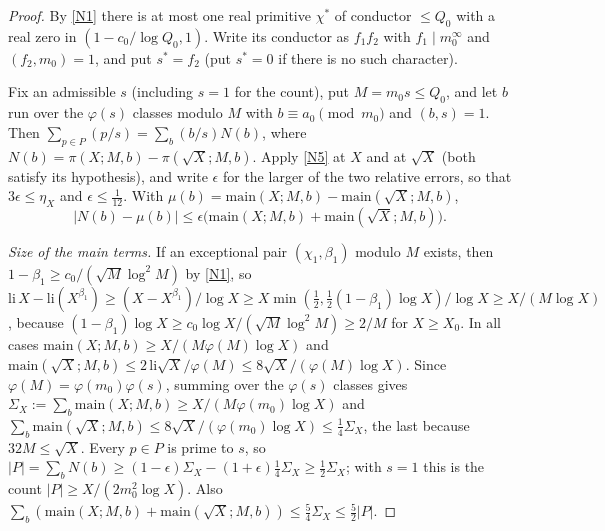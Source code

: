 \documentclass[11pt]{amsart}
\theoremstyle{plain}
\theoremstyle{definition}
\numberwithin{equation}{section}
\begin{document}
\begin{proof}
By \ref{N1} there is at most one real primitive $\chi^\ast$ of conductor $\le Q_0$ with a real zero
in $(1-c_0/\log Q_0,1)$. Write its conductor as $f_1f_2$ with $f_1\mid m_0^\infty$ and
$(f_2,m_0)=1$, and put $s^\ast=f_2$ (put $s^\ast=0$ if there is no such character).

Fix an admissible $s$ (including $s=1$ for the count), put $M=m_0s\le Q_0$, and let $b$ run over
the $\varphi(s)$ classes modulo $M$ with $b\equiv a_0\pmod{m_0}$ and $(b,s)=1$. Then
$\sum_{p\in P}(p/s)=\sum_b(b/s)N(b)$, where $N(b)=\pi(X;M,b)-\pi(\sqrt X;M,b)$. Apply \ref{N5} at
$X$ and at $\sqrt X$ (both satisfy its hypothesis), and write $\epsilon$ for the larger of the two
relative errors, so that $3\epsilon\le\eta_X$ and $\epsilon\le\frac1{12}$. With $\mu(b)=\mathrm{main}(X;M,b)-\mathrm{main}(\sqrt X;M,b)$,
\[
|N(b)-\mu(b)|\le\epsilon\bigl(\mathrm{main}(X;M,b)+\mathrm{main}(\sqrt X;M,b)\bigr).
\]

\emph{Size of the main terms.} If an exceptional pair $(\chi_1,\beta_1)$ modulo $M$ exists, then
$1-\beta_1\ge c_0/(\sqrt M\log^2M)$ by \ref{N1}, so
$\mathrm{li}\,X-\mathrm{li}(X^{\beta_1})\ge(X-X^{\beta_1})/\log X\ge X\min(\frac12,\frac12(1-\beta_1)\log X)/\log X
\ge X/(M\log X)$, because $(1-\beta_1)\log X\ge c_0\log X/(\sqrt M\log^2M)\ge2/M$ for $X\ge X_0$. In
all cases $\mathrm{main}(X;M,b)\ge X/(M\varphi(M)\log X)$ and
$\mathrm{main}(\sqrt X;M,b)\le2\,\mathrm{li}\sqrt X/\varphi(M)\le8\sqrt X/(\varphi(M)\log X)$. Since
$\varphi(M)=\varphi(m_0)\varphi(s)$, summing over the $\varphi(s)$ classes gives
$\Sigma_X:=\sum_b\mathrm{main}(X;M,b)\ge X/(M\varphi(m_0)\log X)$ and
$\sum_b\mathrm{main}(\sqrt X;M,b)\le8\sqrt X/(\varphi(m_0)\log X)\le\frac14\Sigma_X$, the last because
$32M\le\sqrt X$. Every $p\in P$ is prime to $s$, so $|P|=\sum_bN(b)\ge(1-\epsilon)\Sigma_X-(1+\epsilon)\frac14\Sigma_X\ge\frac12\Sigma_X$;
with $s=1$ this is the count $|P|\ge X/(2m_0^2\log X)$. Also
$\sum_b(\mathrm{main}(X;M,b)+\mathrm{main}(\sqrt X;M,b))\le\frac54\Sigma_X\le\frac52|P|$.


\end{proof}
\end{document}
